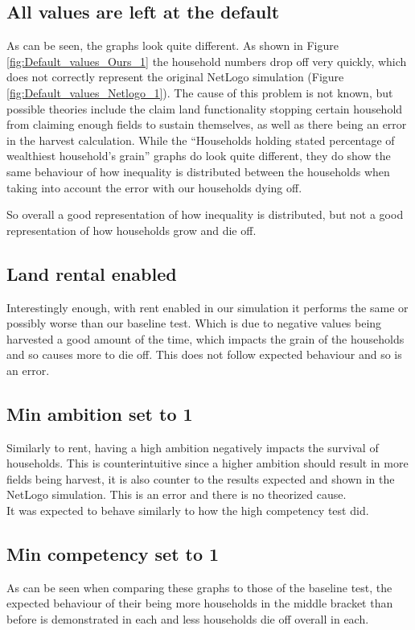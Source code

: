 \documentclass[12pt]{article}
\begin{document}
			\subsection{All values are left at the default}
				As can be seen, the graphs look quite different. As shown in Figure \ref{fig:Default_values_Ours_1} the household numbers drop off very quickly, which does not correctly represent the original NetLogo simulation (Figure \ref{fig:Default_values_Netlogo_1}). The cause of this problem is not known, but possible theories include the claim land functionality stopping certain household from claiming enough fields to sustain themselves, as well as there being an error in the harvest calculation. 
				While the “Households holding stated percentage of wealthiest household’s grain” graphs do look quite different, they do show the same behaviour of how inequality is distributed between the households when taking into account the error with our households dying off.
		
				So overall a good representation of how inequality is distributed, but not a good representation of how households grow and die off.
		
			\subsection{Land rental enabled}
				Interestingly enough, with rent enabled in our simulation it performs the same or possibly worse than our baseline test. Which is due to negative values being harvested a good amount of the time, which impacts the grain of the households and so causes more to die off. This does not follow expected behaviour and so is an error.
		
			\subsection{Min ambition set to 1}
				Similarly to rent, having a high ambition negatively impacts the survival of households. This is counterintuitive since a higher ambition should result in more fields being harvest, it is also counter to the results expected and shown in the NetLogo simulation. This is an error and there is no theorized cause.\\
				It was expected to behave similarly to how the high competency test did.\\

			\subsection{Min competency set to 1}		
				As can be seen when comparing these graphs to those of the baseline test, the expected behaviour of their being more households in the middle bracket than before is demonstrated in each and less households die off overall in each. 
			
\end{document}
